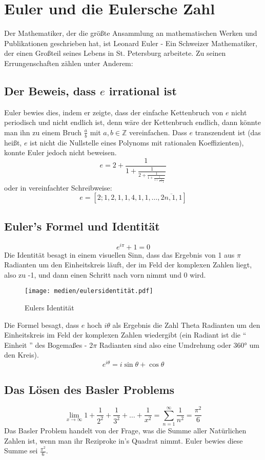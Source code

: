 \section{Euler und die Eulersche Zahl}
Der Mathematiker, der die größte Ansammlung an mathematischen Werken und Publikationen geschrieben hat, ist Leonard Euler - Ein Schweizer Mathematiker, der einen Großteil seines Lebens in St. Petersburg arbeitete. Zu seinen Errungenschaften zählen unter Anderem: 
\subsection{Der Beweis, dass $e$ irrational ist}
Euler bewies dies, indem er zeigte, dass der einfache Kettenbruch von $e$ nicht periodisch und nicht endlich ist, denn wäre der Kettenbruch endlich, dann könnte man ihn zu einem Bruch $\frac{a}{b}$ mit $a,b \in \mathbb{Z}$ vereinfachen. Dass $e$ transzendent ist (das heißt, $e$ ist nicht die Nullstelle eines Polynoms mit rationalen Koeffizienten), konnte Euler jedoch nicht beweisen. \[
e = 2 +\frac{1}{1 + \frac{1}{2 + \frac{1}{1 + \frac{1}{1 + \frac{1}{4 + \frac{1}{\ddots}}}}}} \] 
oder in vereinfachter Schreibweise: \[
e = [2; 1,2,1,1,4,1,1,\dots,\overline{2n,1,1}] \]
\subsection{Euler's Formel und Identität}
\[ e^{i\pi} + 1 = 0 \]
Die Identität besagt in einem visuellen Sinn, dass das Ergebnis von 1 aus $\pi$ Radianten um den Einheitskreis läuft, der im Feld der komplexen Zahlen liegt, also zu -1, und dann einen Schritt nach vorn nimmt und 0 wird.
\begin{figure}[h]
\texttt{[image: medien/eulersidentität.pdf]}
\centering
\caption{Eulers Identität}
\end{figure}
\newpage
\par Die Formel besagt, dass $e$ hoch $i\theta$ als Ergebnis die Zahl Theta Radianten um den Einheitskreis im Feld der komplexen Zahlen wiedergibt (ein Radiant ist die "` Einheit "' des Bogemaßes - 2$\pi$ Radianten sind also eine Umdrehung oder  360° um den Kreis).
\[ e^{i\theta} = i\sin{\theta} + \cos{\theta} \] 
\subsection{Das Lösen des Basler Problems}
 \[ \lim_{x\to\infty} 1 + \frac{1}{2^2} + \frac{1}{3^2} + \dots + \frac{1}{x^2} = \sum_{n=1}^{\infty} \frac{1}{n^2} = \frac{\pi^2}{6}\]
Das Basler Problem handelt von der Frage, was die Summe aller Natürlichen Zahlen ist, wenn man ihr Reziproke in's Quadrat nimmt. Euler bewies diese Summe sei $\frac{\pi^2}{6}$.

